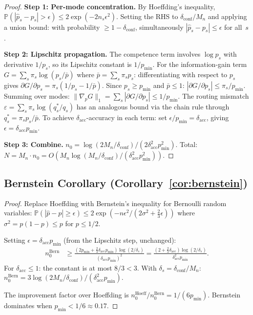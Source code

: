 \documentclass[twoside,11pt]{article}
\newcommand{\Prb}{\mathbb{P}}
\newcommand{\Mn}{M_n}
\newcommand{\pmin}{p_{\min}}
\newcommand{\dacc}{\delta_{\mathrm{acc}}}
\newcommand{\dconf}{\delta_{\mathrm{conf}}}
\newcommand{\mismatch}{\varepsilon}
\begin{document}
\begin{proof}
\noindent\textbf{Step 1: Per-mode concentration.}
By Hoeffding's inequality, $\Prb(|\hat{p}_s - p_s| > \epsilon) \le 2\exp(-2n_s\epsilon^2)$.
Setting the RHS to $\dconf/\Mn$ and applying a union bound: with probability $\ge 1-\dconf$, simultaneously $|\hat{p}_s - p_s| \le \epsilon$ for all~$s$.

\noindent\textbf{Step 2: Lipschitz propagation.}
The competence term involves $\log p_s$ with derivative $1/p_s$, so its Lipschitz constant is $1/\pmin$.
For the information-gain term $G = \sum_s \pi_s \log(p_s / \bar{p})$ where $\bar{p} = \sum_s \pi_s p_s$: differentiating with respect to $p_s$ gives $\partial G / \partial p_s = \pi_s(1/p_s - 1/\bar{p})$.
Since $p_s \ge \pmin$ and $\bar{p} \le 1$: $|\partial G / \partial p_s| \le \pi_s / \pmin$.
Summing over modes: $\|\nabla_p G\|_1 = \sum_s |\partial G / \partial p_s| \le 1/\pmin$.
The routing mismatch $\mismatch = \sum_s \pi_s \log(q_s^*/q_s)$ has an analogous bound via the chain rule through $q_s^* = \pi_s p_s / \bar{p}$.
To achieve $\dacc$-accuracy in each term: set $\epsilon/\pmin = \dacc$, giving $\epsilon = \dacc\pmin$.

\noindent\textbf{Step 3: Combine.}
$n_0 = \log(2\Mn/\dconf) / (2\dacc^2\pmin^2)$.
Total: $N = \Mn \cdot n_0 = O(\Mn\log(\Mn/\dconf)/(\dacc^2\pmin^2))$.
\end{proof}

\subsection{Bernstein Corollary (Corollary~\ref{cor:bernstein})}
\label{app:bernstein}

\begin{proof}
Replace Hoeffding with Bernstein's inequality for Bernoulli random variables:
$\Prb(|\hat{p} - p| \ge \epsilon) \le 2\exp(-n\epsilon^2 / (2\sigma^2 + \frac{2}{3}\epsilon))$
where $\sigma^2 = p(1-p) \le p$ for $p \le 1/2$.

Setting $\epsilon = \dacc\pmin$ (from the Lipschitz step, unchanged):
\begin{align}
  n_0^{\mathrm{Bern}} &\ge \frac{(2\pmin + \frac{2}{3}\dacc\pmin)\log(2/\delta_s)}{(\dacc\pmin)^2}
  = \frac{(2 + \frac{2}{3}\dacc)\log(2/\delta_s)}{\dacc^2\pmin}.
\end{align}
For $\dacc \le 1$: the constant is at most $8/3 < 3$.
With $\delta_s = \dconf/\Mn$:
$n_0^{\mathrm{Bern}} = 3\log(2\Mn/\dconf)/(\dacc^2\pmin)$.

The improvement factor over Hoeffding is $n_0^{\mathrm{Hoeff}}/n_0^{\mathrm{Bern}} = 1/(6\pmin)$.
Bernstein dominates when $\pmin < 1/6 \approx 0.17$.
\end{proof}
\end{document}

